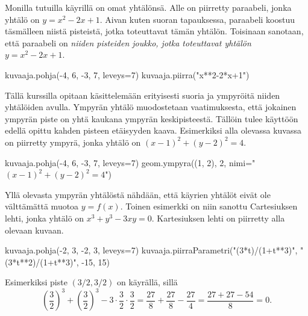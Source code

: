 Monilla tutuilla käyrillä on omat yhtälönsä.
Alle on piirretty paraabeli, jonka yhtälö on $y=x^2-2x+1$.
Aivan kuten suoran tapauksessa, paraabeli koostuu täsmälleen niistä pisteistä, jotka toteuttavat tämän yhtälön.
Toisinaan sanotaan, että paraabeli on \emph{niiden pisteiden joukko, jotka toteuttavat yhtälön $y=x^2-2x+1$}.


\begin{kuva}
	kuvaaja.pohja(-4, 6, -3, 7, leveys=7)
	kuvaaja.piirra("x**2-2*x+1")
\end{kuva}

Tällä kurssilla opitaan käsittelemään erityisesti suoria ja ympyröitä niiden yhtälöiden avulla.
Ympyrän yhtälö muodostetaan vaatimuksesta, että jokainen ympyrän piste on yhtä kaukana ympyrän keskipisteestä.
Tällöin tulee käyttöön edellä opittu kahden pisteen etäisyyden kaava.
Esimerkiksi alla olevassa kuvassa on piirretty ympyrä, jonka yhtälö on $(x-1)^2+(y-2)^2=4$.

\begin{kuva}
	kuvaaja.pohja(-4, 6, -3, 7, leveys=7)
	geom.ympyra((1, 2), 2, nimi="$(x-1)^2+(y-2)^2=4$")
\end{kuva}

Yllä olevasta ympyrän yhtälöstä nähdään, että käyrien yhtälöt eivät ole välttämättä muotoa $y=f(x)$.
Toinen esimerkki on niin sanottu Cartesiuksen lehti, jonka yhtälö on $x^3+y^3-3xy=0$.
Kartesiuksen lehti on piirretty alla olevaan kuvaan.

\begin{kuva}
	kuvaaja.pohja(-2, 3, -2, 3, leveys=7)
	kuvaaja.piirraParametri("(3*t)/(1+t**3)", "(3*t**2)/(1+t**3)", -15, 15)
\end{kuva}


Esimerkiksi piste $(3/2, 3/2)$ on käyrällä, sillä
\[
\left(\frac{3}{2}\right)^3+\left(\frac{3}{2}\right)^3-3\cdot\frac{3}{2}\cdot\frac{3}{2}
=\frac{27}{8}+\frac{27}{8}-\frac{27}{4}=\frac{27+27-54}{8}=0.
\]
